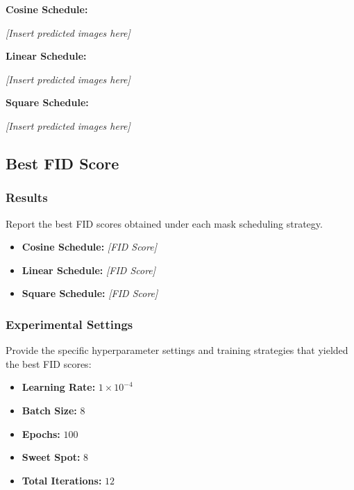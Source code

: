 \textbf{Cosine Schedule:}

\textit{[Insert predicted images here]}

\textbf{Linear Schedule:}

\textit{[Insert predicted images here]}

\textbf{Square Schedule:}

\textit{[Insert predicted images here]}

\subsection{Best FID Score}

\subsubsection{Results}
Report the best FID scores obtained under each mask scheduling strategy.

\begin{itemize}
    \item \textbf{Cosine Schedule:} \textit{[FID Score]}
    \item \textbf{Linear Schedule:} \textit{[FID Score]}
    \item \textbf{Square Schedule:} \textit{[FID Score]}
\end{itemize}

\subsubsection{Experimental Settings}
Provide the specific hyperparameter settings and training strategies that yielded the best FID scores:

\begin{itemize}
    \item \textbf{Learning Rate:} $1\times10^{-4}$
    \item \textbf{Batch Size:} $8$
    \item \textbf{Epochs:} $100$
    \item \textbf{Sweet Spot:} $8$
    \item \textbf{Total Iterations:} $12$
\end{itemize}
